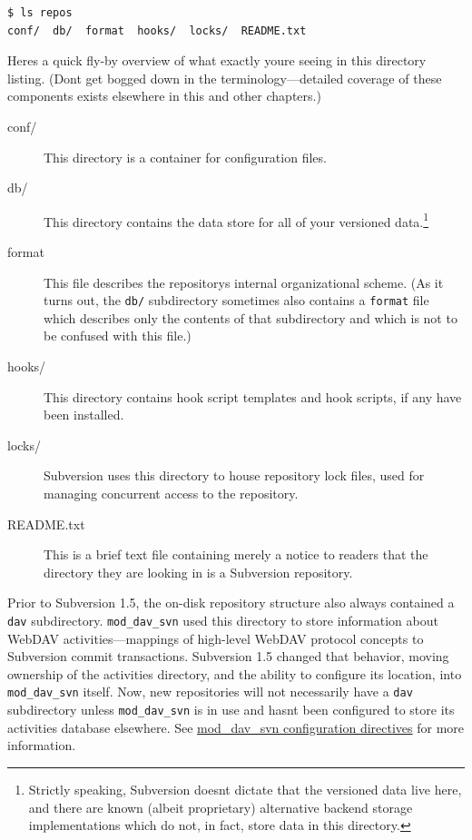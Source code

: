 \begin{verbatim}
$ ls repos
conf/  db/  format  hooks/  locks/  README.txt
\end{verbatim}

Here\textquotesingle s a quick fly-by overview of what exactly
you\textquotesingle re seeing in this directory listing.
(Don\textquotesingle t get bogged down in the terminology---detailed
coverage of these components exists elsewhere in this and other
chapters.)

\begin{description}
\item[conf/]
This directory is a container for configuration files.
\item[db/]
This directory contains the data store for all of your versioned
data.\footnote{Strictly speaking, Subversion doesn\textquotesingle t
  dictate that the versioned data live here, and there are known (albeit
  proprietary) alternative backend storage implementations which do not,
  in fact, store data in this directory.}
\item[format]
This file describes the repository\textquotesingle s internal
organizational scheme. (As it turns out, the \texttt{db/} subdirectory
sometimes also contains a \texttt{format} file which describes only the
contents of that subdirectory and which is not to be confused with this
file.)
\item[hooks/]
This directory contains hook script templates and hook scripts, if any
have been installed.
\item[locks/]
Subversion uses this directory to house repository lock files, used for
managing concurrent access to the repository.
\item[README.txt]
This is a brief text file containing merely a notice to readers that the
directory they are looking in is a Subversion repository.
\end{description}

Prior to Subversion 1.5, the on-disk repository structure also always
contained a \texttt{dav} subdirectory. \texttt{mod\_dav\_svn} used this
directory to store information about WebDAV activities---mappings of
high-level WebDAV protocol concepts to Subversion commit transactions.
Subversion 1.5 changed that behavior, moving ownership of the activities
directory, and the ability to configure its location, into
\texttt{mod\_dav\_svn} itself. Now, new repositories will not
necessarily have a \texttt{dav} subdirectory unless
\texttt{mod\_dav\_svn} is in use and hasn\textquotesingle t been
configured to store its activities database elsewhere. See
\hyperref[svn.serverconfig.httpd.ref.mod_dav_svn]{mod\_dav\_svn
configuration directives} for more information.

